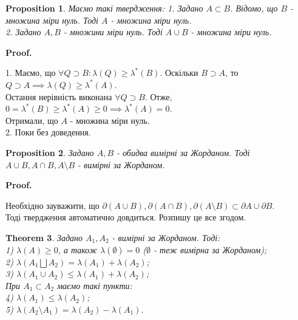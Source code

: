 \documentclass[a4paper, 10pt]{article}
\makeatletter
\def\qed{$\blacksquare$}
\theoremstyle{theoremdd}
\newtheorem{theorem}{Theorem}[subsection]
\theoremstyle{theoremdd}
\theoremstyle{theoremdd}
\theoremstyle{theoremdd}
\theoremstyle{theoremdd}
\newtheorem{proposition}[theorem]{Proposition}
\theoremstyle{theoremdd}
\theoremstyle{theoremdd}
\theoremstyle{theoremdd}
\renewenvironment{proof}[1][Proof.\\]{\par
\pushQED{\hfill \qed}%
\normalfont \topsep6\p@\@plus6\p@\relax
\trivlist
\item\relax
{\bfseries
#1\@addpunct{.}}\hspace\labelsep\ignorespaces
}{%
\popQED\endtrivlist\@endpefalse
}
\makeatother
\begin{document}
\begin{proposition} Маємо такі твердження:
1. Задано $A \subset B$. Відомо, що $B$ - множина міри нуль. Тоді $A$ - множина міри нуль.\\
2. Задано $A,B$ - множини міри нуль. Тоді $A \cup B$ - множина міри нуль.
\end{proposition}

\begin{proof}
1. Маємо, що $\forall Q \supset B: \lambda(Q) \geq \lambda^*(B)$. Оскільки $B \supset A$, то $Q \supset A \implies \lambda(Q) \geq \lambda^*(A)$.\\
Остання нерівність виконана $\forall Q \supset B$. Отже, $0= \lambda^*(B) \geq \lambda^*(A) \geq 0 \implies \lambda^*(A) = 0$.\\
Отримали, що $A$ - множина міри нуль.
\bigskip \\
2. Поки без доведення.
\end{proof}

\begin{proposition}
Задано $A,B$ - обидва вимірні за Жорданом. Тоді $A \cup B, A \cap B, A \setminus B$ - вимірні за Жорданом.
\end{proposition}

\begin{proof}
Необхідно зауважити, що $\partial (A \cup B), \partial (A \cap B), \partial (A \setminus B) \subset \partial A \cup \partial B$.\\
Тоді твердження автоматично довдиться. Розпишу це все згодом.
\end{proof}

\begin{theorem}
Задано $A_1,A_2$ - вимірні за Жорданом. Тоді:\\
1) $\lambda(A) \geq 0$, а також $\lambda(\emptyset) = 0$ ($\emptyset$ - теж вимірна за Жорданом);\\
2) $\lambda(A_1 \bigsqcup A_2) = \lambda(A_1) + \lambda(A_2)$;\\
3) $\lambda (A_1 \cup A_2) \leq \lambda(A_1) + \lambda(A_2)$;\\
При $A_1 \subset A_2$ маємо такі пункти:\\
4) $\lambda(A_1) \leq \lambda(A_2)$;\\
5) $\lambda(A_2 \setminus A_1) = \lambda(A_2) - \lambda(A_1)$.
\end{theorem}
\end{document}
